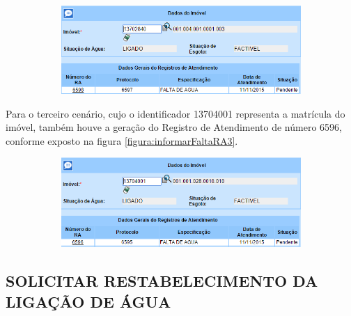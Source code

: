 \begin{figure}[H]
	\centering
	\caption{Informar Falta de Água - RA gerado para o Cenário 2}
	\label{figura:informarFaltaRA2}
	\begin{subfigure}[H]{\textwidth}
		\centering
		\includegraphics{figuras/cenarios/informar_falta_agua/resultado_2.PNG}
	\end{subfigure}
\end{figure}

Para o terceiro cenário, cujo o identificador 13704001 representa a matrícula do imóvel, também houve a geração do Registro de Atendimento de número 6596, conforme exposto na figura \ref{figura:informarFaltaRA3}.	

\begin{figure}[H]
	\centering
	\caption{Informar Falta de Água - RA gerado para o Cenário 3}
	\label{figura:informarFaltaRA3}
	\begin{subfigure}[H]{\textwidth}
		\centering
		\includegraphics{figuras/cenarios/informar_falta_agua/resultado_3.PNG}
	\end{subfigure}
\end{figure}

		
\subsection{\textbf{\uppercase{Solicitar Restabelecimento da Ligação de Água}}}

